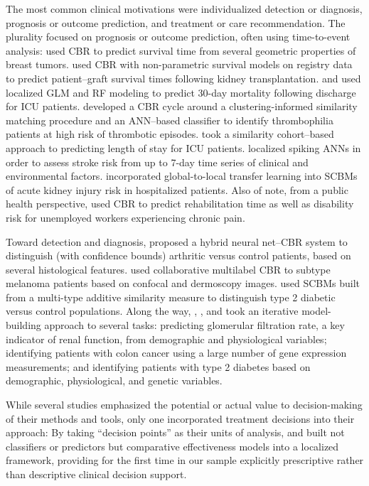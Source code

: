 \documentclass[sn-mathphys,Numbered,pdflatex]{sn-jnl}
\theoremstyle{remark}
\theoremstyle{definition}
\newcommand{\hl}[1]{#1}
\begin{document}
The most common clinical motivations were individualized detection or
diagnosis, prognosis or outcome prediction, and treatment or care
recommendation. The plurality focused on prognosis or outcome
prediction, often using time-to-event analysis: \citet{Mariuzzi1997}
used CBR to predict survival time from several geometric properties of
breast tumors. \citet{Lowsky2013} used CBR with non-parametric survival
models on registry data to predict patient--graft survival times
following kidney transplantation. \citet{Lee2015} and \citet{Lee2017}
used localized \hl{GLM} and RF modeling to predict 30-day mortality
following discharge for ICU patients. \citet{Vilhena2016} developed a
CBR cycle around a clustering-informed similarity matching procedure and
an \hl{ANN}--based classifier to identify thrombophilia patients at high
risk of thrombotic episodes. \citet{Ma2020} took a similarity
cohort--based approach to predicting length of stay for ICU patients.
\citet{Doborjeh2022} localized spiking \hl{ANN}s in order to assess
stroke risk from up to 7-day time series of clinical and environmental
factors. \citet{Liu2022} incorporated global-to-local transfer learning
into \hl{SCBM}s of acute kidney injury risk in hospitalized patients.
Also of note, from a public health perspective, \citet{Xu2008} used CBR
to predict rehabilitation time as well as disability risk for unemployed
workers experiencing chronic pain.

Toward detection and diagnosis, \citet{Wyns2004} proposed a hybrid
neural net--CBR system to distinguish (with confidence bounds) arthritic
versus control patients, based on several histological features.
\citet{Nicolas2014} used collaborative multilabel CBR to subtype
melanoma patients based on confocal and dermoscopy images.
\citet{Wang2019} used \hl{SCBM}s built from a multi-type additive
similarity measure to distinguish type 2 diabetic versus control
populations. Along the way, \citet{Song2006}, \citet{Kasabov2010}, and
\citet{Verma2015} took an iterative model-building approach to several
tasks: predicting glomerular filtration rate, a key indicator of renal
function, from demographic and physiological variables; identifying
patients with colon cancer using a large number of gene expression
measurements; and identifying patients with type 2 diabetes based on
demographic, physiological, and genetic variables.

While several studies emphasized the potential or actual value to
decision-making of their methods and tools, only one incorporated
treatment decisions into their approach: By taking ``decision points''
as their units of analysis, \citet{Tang2021} and \citet{Ng2021} built
not classifiers or predictors but comparative effectiveness models into
a localized framework, providing for the first time in our sample
explicitly prescriptive rather than descriptive clinical decision
support.
\end{document}
